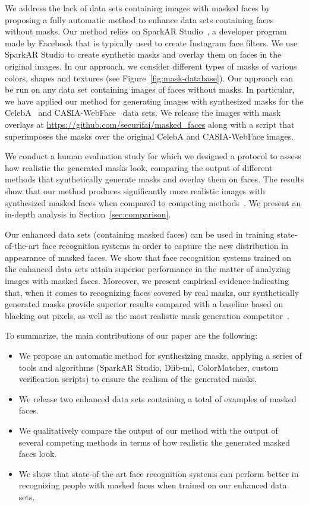 \documentclass{article}
\begin{document}
We address the lack of data sets containing images with masked faces by proposing a fully automatic method to enhance data sets containing faces without masks. Our method relies on SparkAR Studio~\cite{spark-ar-studio}, a developer program made by Facebook that is typically used to create Instagram face filters. We use SparkAR Studio to create synthetic masks and overlay them on faces in the original images. In our approach, we consider  different types of masks of various colors, shapes and textures (see Figure~\ref{fig:mask-database}). Our approach can be run on any data set containing images of faces without masks. In particular, we have applied our method for generating images with synthesized masks for the CelebA~\cite{Liu2015ICCV} and CASIA-WebFace~\cite{yi2014learning} data sets. We release the images with mask overlays at {\small \url{https://github.com/securifai/masked_faces}} along with a script that superimposes the masks over the original CelebA and CASIA-WebFace images. 

We conduct a human evaluation study for which we designed a protocol to assess how realistic the generated masks look, comparing the output of different methods that synthetically generate masks and overlay them on faces. The results show that our method produces significantly more realistic images with synthesized masked faces when compared to competing methods~\cite{wang2020arxiv,anwar2020arxiv,huang2021icassp}. 
We present an in-depth analysis in Section~\ref{sec:comparison}. 

Our enhanced data sets (containing masked faces) can be used in training state-of-the-art face recognition systems in order to capture the new distribution in appearance of masked faces. We show that face recognition systems trained on the enhanced data sets attain superior performance in the matter of analyzing images with masked faces. Moreover, we present empirical evidence indicating that, when it comes to recognizing faces covered by real masks, our synthetically generated masks provide superior results compared with a baseline based on blacking out pixels, as well as the most realistic mask generation competitor~\cite{anwar2020arxiv}.

To summarize, the main contributions of our paper are the following: 
\begin{itemize}
    \item We propose an automatic method for synthesizing masks, applying a series of tools and algorithms (SparkAR Studio, Dlib-ml, ColorMatcher, custom verification scripts) to ensure the realism of the generated masks.
    \item We release two enhanced data sets containing a total of  examples of masked faces.
    \item We qualitatively compare the output of our method with the output of several competing methods in terms of how realistic the generated masked faces look.
    \item We show that state-of-the-art face recognition systems can perform better in recognizing people with masked faces when trained on our enhanced data sets.
\end{itemize}
\end{document}
